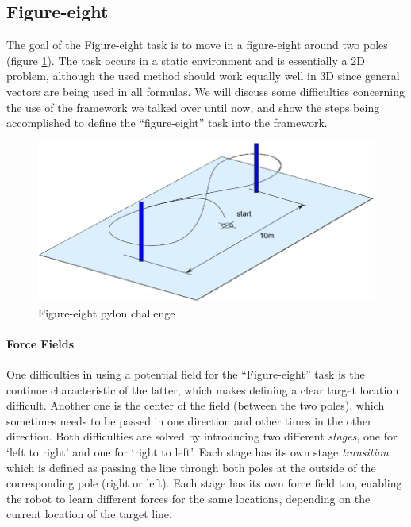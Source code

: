 \documentclass[11pt]{article}
\begin{document}
\subsection{Figure-eight}

The goal of the Figure-eight task is to move in a figure-eight around two poles (figure \ref{fig:pylonchallenge}). The task occurs in a static environment and is essentially a 2D problem, although the used method should work equally well in 3D since general vectors are being used in all formulas. We will discuss some difficulties concerning the use of the framework we talked over until now, and show the steps being accomplished to define the ``figure-eight'' task into the framework.

  \begin{figure}
    \includegraphics[width=1.0\textwidth]{img/imav2011_pylon}
    \caption{Figure-eight pylon challenge}
    \label{fig:pylonchallenge}
  \end{figure}

\paragraph{Force Fields}
One difficulties in using a potential field for the ``Figure-eight'' task is the continue characteristic of the latter, which makes defining a clear target location difficult. Another one is the center of the field (between the two poles), which sometimes needs to be passed in one direction and other times in the other direction. Both difficulties are solved by introducing two different \emph{stages}, one for `left to right' and one for `right to left'. Each stage has its own stage \emph{transition} which is defined as passing the line through both poles at the outside of the corresponding pole (right or left). Each stage has its own force field too, enabling the robot to learn different forces for the same locations, depending on the current location of the target line.
\end{document}

